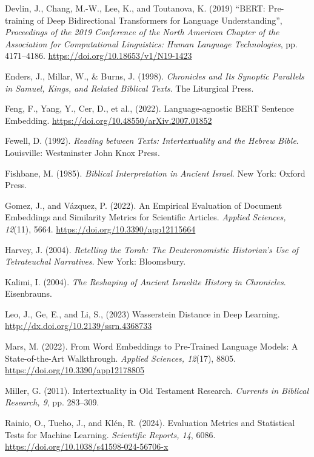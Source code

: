 \documentclass[12pt]{article}
\begin{document}
\begin{thebibliography}{99}

 Devlin, J., Chang, M.-W., Lee, K., and Toutanova, K. (2019) “BERT: Pre-training of Deep Bidirectional Transformers for Language Understanding”, \textit{Proceedings of the 2019 Conference of the North American Chapter of the Association for Computational Linguistics: Human Language Technologies}, pp. 4171–4186. \url{https://doi.org/10.18653/v1/N19-1423}

 Enders, J., Millar, W., \& Burns, J. (1998). \textit{Chronicles and Its Synoptic Parallels in Samuel, Kings, and Related Biblical Texts}. The Liturgical Press.

 Feng, F., Yang, Y., Cer, D., et al., (2022). Language-agnostic BERT Sentence Embedding. \url{https://doi.org/10.48550/arXiv.2007.01852}

 Fewell, D. (1992). \textit{Reading between Texts: Intertextuality and the Hebrew Bible}. Louisville: Westminster John Knox Press.

 Fishbane, M. (1985). \textit{Biblical Interpretation in Ancient Israel}. New York: Oxford Press.

 Gomez, J., and Vázquez, P. (2022). An Empirical Evaluation of Document Embeddings and Similarity Metrics for Scientific Articles. \textit{Applied Sciences, 12}(11), 5664. \url{https://doi.org/10.3390/app12115664}

 Harvey, J. (2004). \textit{Retelling the Torah: The Deuteronomistic Historian's Use of Tetrateuchal Narratives}. New York: Bloomsbury.

 Kalimi, I. (2004). \textit{The Reshaping of Ancient Israelite History in Chronicles}. Eisenbrauns.

 Leo, J., Ge, E., and Li, S., (2023) Wasserstein Distance in Deep Learning. \url{http://dx.doi.org/10.2139/ssrn.4368733} 

 Mars, M. (2022). From Word Embeddings to Pre-Trained Language Models: A State-of-the-Art Walkthrough. \textit{Applied Sciences, 12}(17), 8805. \url{https://doi.org/10.3390/app12178805}

 Miller, G. (2011). Intertextuality in Old Testament Research. \textit{Currents in Biblical Research, 9}, pp. 283–309.

 Rainio, O., Tueho, J., and Klén, R. (2024). Evaluation Metrics and Statistical Tests for Machine Learning. \textit{Scientific Reports, 14}, 6086. \url{https://doi.org/10.1038/s41598-024-56706-x}


\end{thebibliography}
\end{document}
